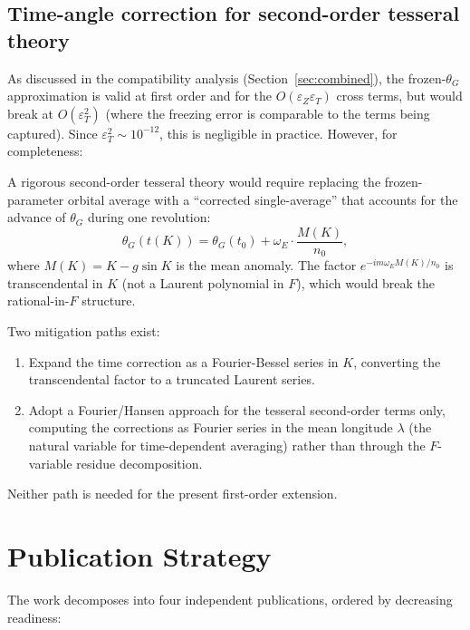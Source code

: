 \documentclass[11pt]{article}
\newcommand{\eps}{\varepsilon}
\begin{document}
\subsection{Time-angle correction for second-order tesseral theory}

As discussed in the compatibility analysis
(Section~\ref{sec:combined}), the frozen-$\theta_G$ approximation is
valid at first order and for the $O(\eps_Z \eps_T)$ cross terms, but
would break at $O(\eps_T^2)$ (where the freezing error is comparable
to the terms being captured). Since $\eps_T^2 \sim 10^{-12}$, this is
negligible in practice. However, for completeness:

A rigorous second-order tesseral theory would require replacing the
frozen-parameter orbital average with a ``corrected single-average'' that
accounts for the advance of $\theta_G$ during one revolution:
\begin{equation}
\theta_G(t(K)) = \theta_G(t_0) + \omega_E \cdot \frac{M(K)}{n_0},
\end{equation}
where $M(K) = K - g\sin K$ is the mean anomaly. The factor
$e^{-im\omega_E M(K)/n_0}$ is transcendental in $K$ (not a Laurent
polynomial in $F$), which would break the rational-in-$F$ structure.

Two mitigation paths exist:
\begin{enumerate}
\item Expand the time correction as a Fourier-Bessel series in $K$,
converting the transcendental factor to a truncated Laurent series.
\item Adopt a Fourier/Hansen approach for the tesseral second-order terms
only, computing the corrections as Fourier series in the mean longitude
$\lambda$ (the natural variable for time-dependent averaging) rather
than through the $F$-variable residue decomposition.
\end{enumerate}

Neither path is needed for the present first-order extension.


\section{Publication Strategy}
\label{sec:publication}

The work decomposes into four independent publications, ordered by
decreasing readiness:
\end{document}
